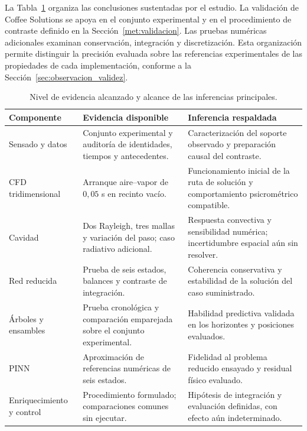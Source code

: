 La Tabla~\ref{tab:dis_evidencia} organiza las conclusiones sustentadas por el estudio. La validación de Coffee Solutions se apoya en el conjunto experimental y en el procedimiento de contraste definido en la Sección~\ref{met:validacion}. Las pruebas numéricas adicionales examinan conservación, integración y discretización. Esta organización permite distinguir la precisión evaluada sobre las referencias experimentales de las propiedades de cada implementación, conforme a la Sección~\ref{sec:observacion_validez}.

\begin{table}[htbp]
\centering
\small
\caption{Nivel de evidencia alcanzado y alcance de las inferencias principales.}
\label{tab:dis_evidencia}
\begingroup
\renewcommand{\arraystretch}{1.25}
\setlength{\tabcolsep}{4pt}
\begin{tabularx}{\textwidth}{>{\raggedright\arraybackslash}p{}>{\raggedright\arraybackslash}X>{\raggedright\arraybackslash}X}
\toprule
Componente & Evidencia disponible & Inferencia respaldada \\
\midrule
Sensado y datos & Conjunto experimental y auditoría de identidades, tiempos y antecedentes. & Caracterización del soporte observado y preparación causal del contraste. \\
CFD tridimensional & Arranque aire--vapor de $0{,}05$ s en recinto vacío. & Funcionamiento inicial de la ruta de solución y comportamiento psicrométrico compatible. \\
Cavidad & Dos Rayleigh, tres mallas y variación del paso; caso radiativo adicional. & Respuesta convectiva y sensibilidad numérica; incertidumbre espacial aún sin resolver. \\
Red reducida & Prueba de seis estados, balances y contraste de integración. & Coherencia conservativa y estabilidad de la solución del caso suministrado. \\
Árboles y ensambles & Prueba cronológica y comparación emparejada sobre el conjunto experimental. & Habilidad predictiva validada en los horizontes y posiciones evaluados. \\
PINN & Aproximación de referencias numéricas de seis estados. & Fidelidad al problema reducido ensayado y residual físico evaluado. \\
Enriquecimiento y control & Procedimiento formulado; comparaciones comunes sin ejecutar. & Hipótesis de integración y evaluación definidas, con efecto aún indeterminado. \\
\bottomrule
\end{tabularx}
\endgroup
\end{table}

